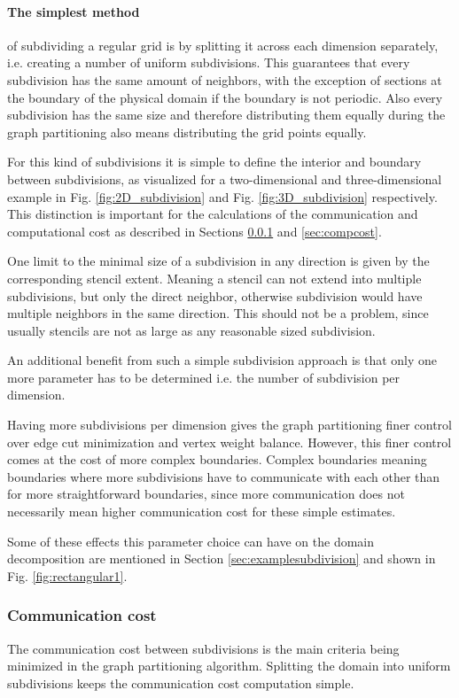 \paragraph{The simplest method}of subdividing a regular grid is by splitting it across each dimension separately, i.e. creating a number of uniform subdivisions.
This guarantees that every subdivision has the same amount of neighbors, with the exception of sections at the boundary of the physical domain if the boundary is not periodic.
Also every subdivision has the same size and therefore distributing them equally during the graph partitioning also means distributing the grid points equally.

For this kind of subdivisions it is simple to define the interior and boundary between subdivisions, as visualized for a two-dimensional and three-dimensional example in Fig. \ref{fig:2D_subdivision} and Fig. \ref{fig:3D_subdivision} respectively.
This distinction is important for the calculations of the communication and computational cost as described in Sections \ref{sec:commcost} and \ref{sec:compcost}.

One limit to the minimal size of a subdivision in any direction is given by the corresponding stencil extent.
Meaning a stencil can not extend into multiple subdivisions, but only the direct neighbor, otherwise subdivision would have multiple neighbors in the same direction.
This should not be a problem, since usually stencils are not as large as any reasonable sized subdivision.

An additional benefit from such a simple subdivision approach is that only one more parameter has to be determined i.e. the number of subdivision per dimension.

Having more subdivisions per dimension gives the graph partitioning finer control over edge cut minimization and vertex weight balance.
However, this finer control comes at the cost of more complex boundaries.
Complex boundaries meaning boundaries where more subdivisions have to communicate with each other than for more straightforward boundaries, since more communication does not necessarily mean higher communication cost for these simple estimates.

Some of these effects this parameter choice can have on the domain decomposition are mentioned in Section \ref{sec:examplesubdivision} and shown in Fig. \ref{fig:rectangular1}.

\subsubsection{Communication cost}
\label{sec:commcost}
The communication cost between subdivisions is the main criteria being minimized in the graph partitioning algorithm.
Splitting the domain into uniform subdivisions keeps the communication cost computation simple.

